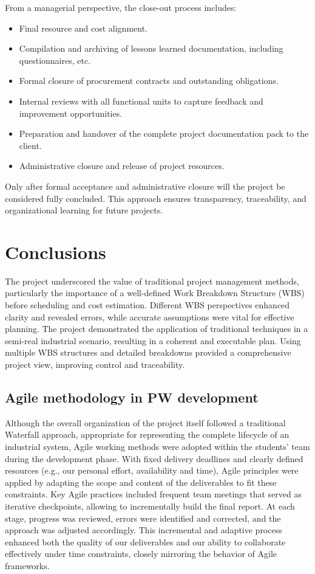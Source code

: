 \documentclass[12pt]{article}
\begin{document}
From a managerial perspective, the close-out process includes:
\begin{itemize}
        \item Final resource and cost alignment.
        \item Compilation and archiving of lessons learned documentation, including questionnaires, etc.
        \item Formal closure of procurement contracts and outstanding obligations.
        \item Internal reviews with all functional units to capture feedback and improvement opportunities.
        \item Preparation and handover of the complete project documentation pack to the client.
        \item Administrative closure and release of project resources.
\end{itemize}

Only after formal acceptance and administrative closure will the project be considered fully concluded. This approach ensures transparency, traceability, and organizational learning for future projects.

\section{Conclusions}
The project underscored the value of traditional project management methods, particularly the importance of a well-defined Work Breakdown Structure (WBS) before scheduling and cost estimation. Different WBS perspectives enhanced clarity and revealed errors, while accurate assumptions were vital for effective planning.
The project demonstrated the application of traditional techniques in a semi-real industrial scenario, resulting in a coherent and executable plan. Using multiple WBS structures and detailed breakdowns provided a comprehensive project view, improving control and traceability.


\subsection{Agile methodology in PW development}
Although the overall organization of the project itself followed a traditional Waterfall approach, appropriate for representing the complete lifecycle of an industrial system, Agile working methods were adopted within the students' team during the development phase.
With fixed delivery deadlines and clearly defined resources (e.g., our personal effort, availability and time), Agile principles were applied by adapting the scope and content of the deliverables to fit these constraints. Key Agile practices included frequent team meetings that served as iterative checkpoints, allowing to incrementally build the final report.
At each stage, progress was reviewed, errors were identified and corrected, and the approach was adjusted accordingly.
This incremental and adaptive process enhanced both the quality of our deliverables and our ability to collaborate effectively under time constraints, closely mirroring the behavior of Agile frameworks.
\end{document}
